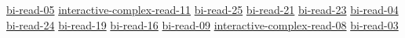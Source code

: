 \hyperref[sec:bi-read-05]{bi-read-05}
\hyperref[sec:interactive-complex-read-11]{interactive-complex-read-11}
\hyperref[sec:bi-read-25]{bi-read-25}
\hyperref[sec:bi-read-21]{bi-read-21}
\hyperref[sec:bi-read-23]{bi-read-23}
\hyperref[sec:bi-read-04]{bi-read-04}
\hyperref[sec:bi-read-24]{bi-read-24}
\hyperref[sec:bi-read-19]{bi-read-19}
\hyperref[sec:bi-read-16]{bi-read-16}
\hyperref[sec:bi-read-09]{bi-read-09}
\hyperref[sec:interactive-complex-read-08]{interactive-complex-read-08}
\hyperref[sec:bi-read-03]{bi-read-03}
